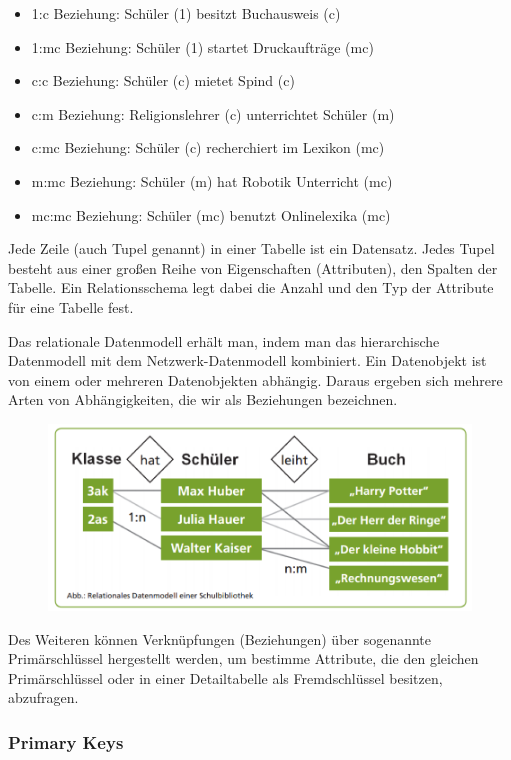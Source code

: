 \begin{itemize}
    \item 1:c Beziehung: Schüler (1) besitzt Buchausweis (c)
    \item 1:mc Beziehung: Schüler (1) startet Druckaufträge (mc)
    \item c:c Beziehung: Schüler (c) mietet Spind (c)
    \item c:m Beziehung: Religionslehrer (c) unterrichtet Schüler (m)
    \item c:mc Beziehung: Schüler (c) recherchiert im Lexikon (mc)
    \item m:mc Beziehung: Schüler (m) hat Robotik Unterricht (mc)
    \item mc:mc Beziehung: Schüler (mc) benutzt Onlinelexika (mc)
\end{itemize}

Jede Zeile (auch Tupel genannt) in einer Tabelle ist ein Datensatz. Jedes Tupel besteht aus einer großen Reihe von Eigenschaften (Attributen), den Spalten der Tabelle. Ein Relationsschema legt dabei die Anzahl und den Typ der Attribute für eine Tabelle fest.

Das relationale Datenmodell erhält man, indem man das hierarchische Datenmodell mit dem Netzwerk-Datenmodell kombiniert. Ein Datenobjekt ist von einem oder mehreren Datenobjekten abhängig. Daraus ergeben sich mehrere Arten von Abhängigkeiten, die wir als Beziehungen bezeichnen.

\begin{figure}[H]
    \centering
    \includegraphics[width=.38\textwidth]{Content/images/modellierung/biblio.png}
    \caption{}
    \label{fig:modellierung:biblio}
\end{figure}

Des Weiteren können Verknüpfungen (Beziehungen) über sogenannte Primärschlüssel hergestellt werden, um bestimme Attribute, die den gleichen Primärschlüssel oder in einer Detailtabelle als Fremdschlüssel besitzen, abzufragen.

\subsubsection{Primary Keys}

